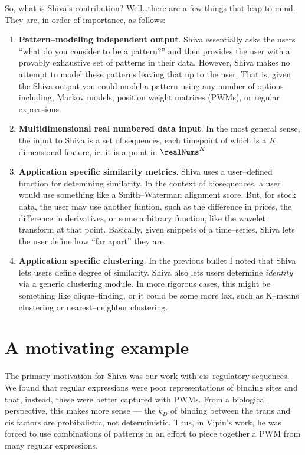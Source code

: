 So, what is Shiva's contribution?  Well\ldots there are a few things that
leap to mind.  They are, in order of importance, as follows:
\begin{enumerate}
    \item   \textbf{Pattern--modeling independent output}.
	    Shiva essentially asks the users ``what do you consider
	    to be a pattern?'' and then provides the user with a
	    provably exhaustive set of patterns in their data.
	    However, Shiva makes no attempt to model these patterns
	    leaving that up to the user.  That is, given the Shiva
	    output you could model a pattern using any number of 
	    options including, Markov models, position weight matrices (PWMs),
	    or regular expressions.
    \item   \textbf{Multidimensional real numbered data input}.  In the 
	    most general sense, the input to Shiva is a set of sequences,
	    each timepoint of which is a $K$ dimensional feature, ie. it
	    is a point in $\realNums^{K}$
    \item   \textbf{Application specific similarity metrics}.  Shiva uses
	    a user--defined function for detemining similarity.  In the
	    context of biosequences, a user would use something like a
	    Smith--Waterman alignment score.  But, for stock data, the user
	    may use another funtion, such as the difference in prices,
	    the difference in derivatives, or some arbitrary function,
	    like the wavelet transform at that point.  Basically, given
	    snippets of a time--series, Shiva lets the user define how
	    ``far apart'' they are.
    \item   \textbf{Application specific clustering}.  In the previous
	    bullet I noted that Shiva lets users define degree of similarity.
	    Shiva also lets users determine \emph{identity} via a generic
	    clustering module.  In more rigorous cases, this might be something
	    like clique--finding, or it could be some more lax, such as 
	    K--means clustering or nearest--neighbor clustering.
\end{enumerate}

\section{A motivating example}
The primary motivation for Shiva was our work with cis--regulatory sequences.
We found that regular expressions were poor representations of binding sites
and that, instead, these were better captured with PWMs.  From a biological
perspective, this makes more sense --- the $k_D$ of binding between the trans
and cis factors are probibalistic, not deterministic.  Thus, in Vipin's work,
he was forced to use combinations of patterns in an effort to piece together
a PWM from many regular expressions.

